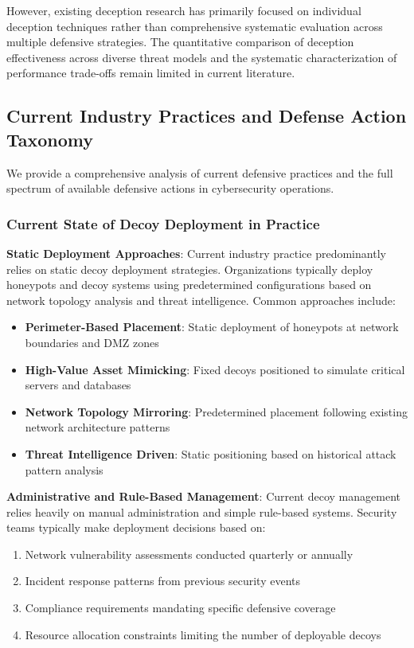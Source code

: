 \documentclass[12pt,oneside,a4paper]{article}
\theoremstyle{definition}
\theoremstyle{plain}
\begin{document}
However, existing deception research has primarily focused on individual deception techniques rather than comprehensive systematic evaluation across multiple defensive strategies. The quantitative comparison of deception effectiveness across diverse threat models and the systematic characterization of performance trade-offs remain limited in current literature.

\subsection{Current Industry Practices and Defense Action Taxonomy}

We provide a comprehensive analysis of current defensive practices and the full spectrum of available defensive actions in cybersecurity operations.

\subsubsection{Current State of Decoy Deployment in Practice}

\textbf{Static Deployment Approaches}: Current industry practice predominantly relies on static decoy deployment strategies. Organizations typically deploy honeypots and decoy systems using predetermined configurations based on network topology analysis and threat intelligence. Common approaches include:

\begin{itemize}
\item \textbf{Perimeter-Based Placement}: Static deployment of honeypots at network boundaries and DMZ zones
\item \textbf{High-Value Asset Mimicking}: Fixed decoys positioned to simulate critical servers and databases  
\item \textbf{Network Topology Mirroring}: Predetermined placement following existing network architecture patterns
\item \textbf{Threat Intelligence Driven}: Static positioning based on historical attack pattern analysis
\end{itemize}

\textbf{Administrative and Rule-Based Management}: Current decoy management relies heavily on manual administration and simple rule-based systems. Security teams typically make deployment decisions based on:

\begin{enumerate}
\item Network vulnerability assessments conducted quarterly or annually
\item Incident response patterns from previous security events
\item Compliance requirements mandating specific defensive coverage
\item Resource allocation constraints limiting the number of deployable decoys
\end{enumerate}
\end{document}
